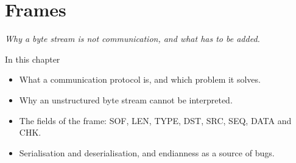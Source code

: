 \chapter{Frames}
\label{ch:frames}


{\large\itshape Why a byte stream is not communication, and what has to be added.\par}

\begin{chapterbox}{In this chapter}
\begin{itemize}
  \item What a communication protocol is, and which problem it solves.
  \item Why an unstructured byte stream cannot be interpreted.
  \item The fields of the frame: SOF, LEN, TYPE, DST, SRC, SEQ, DATA and CHK.
  \item Serialisation and deserialisation, and endianness as a source of bugs.
\end{itemize}
\end{chapterbox}





